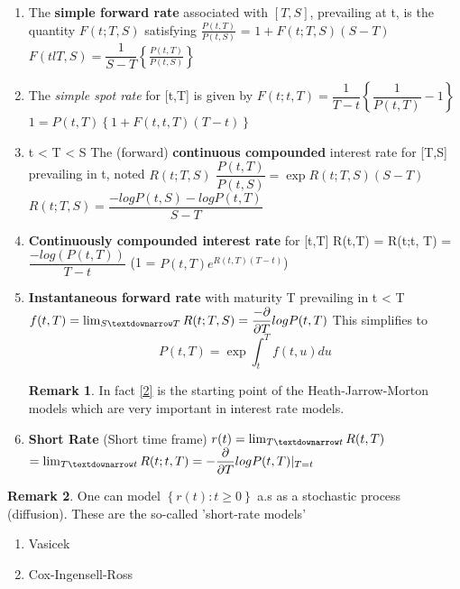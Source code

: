 \documentclass[10pt, oneside, reqno]{amsbook}
\theoremstyle{plain}%
\theoremstyle{definition}
\theoremstyle{rem}
\newtheorem*{rem}{Remark}
\theoremstyle{definition}
\numberwithin{equation}{chapter}
\begin{document}
\begin{enumerate}
 \item The \textbf{simple forward rate} associated with $[T,S]$, prevailing at t, is the quantity $F(t; T, S)$ 
satisfying 
$\frac{P(t,T)}{P(t,S)}$ = $1 + F(t; T, S)(S - T)$
\newline $F(tl T, S) = \dfrac{1}{S-T} \left\lbrace \frac{P(t,T)}{P(t,S)}\right\rbrace$
\item The \textit{simple spot rate} for [t,T] is given by 
$F(t; t, T) = \dfrac{1}{T-t} \left\lbrace \dfrac{1}{P(t,T)} - 1 \right\rbrace$
\newline $1 = P(t,T) \left\lbrace 1 + F(t,t, T) (T-t) \right\rbrace$
\item t < T < S
\newline The (forward) \textbf{continuous compounded} interest rate for [T,S] prevailing in t, noted $R(t; T, S)$
\newline $\dfrac{P(t,T)}{P(t,S)} = \exp {R(t;T,S)(S-T)}$
\newline $R(t; T, S) = \dfrac{-log P(t,S) - log P(t,T)}{S - T}$
\item \textbf{Continuously compounded interest rate} for [t,T]
\newline R(t,T) = R(t;t, T) = $\dfrac{-log(P(t,T))}{T-t}$
\newline (1 = $P(t,T) e^{R(t,T)(T-t)}$)
\item \textbf{Instantaneous forward rate} with maturity T prevailing in t < T
\newline $f(t,T) = \lim_{S \textdownarrow T}R(t; T, S) = \dfrac{-\partial}{\partial T} log P(t,T)$
This simplifies to 
\begin{equation}\label{2}
 P(t,T) = \exp {\int_t^T f(t,u) du}
\end{equation}
\begin{rem} In fact \ref{2} is the starting point of the Heath-Jarrow-Morton models which are very important in 
 interest rate models. 
\end{rem}
\item \textbf{Short Rate} (Short time frame)
\newline $r(t) = \lim_{T \textdownarrow t}R(t,T)$
\newline \quad $=\lim_{T \textdownarrow t} R(t; t, T) = - \dfrac{\partial}{\partial T} log P(t,T)|_{T=t}$
\end{enumerate}
\begin{rem} One can model $\left\lbrace r(t): t \geq 0\right\rbrace$ a.s as a stochastic process (diffusion). These 
are the so-called 'short-rate models' 
\begin{enumerate} 
 \item Vasicek 
\item Cox-Ingensell-Ross
\end{enumerate}
\end{rem}
\end{document}
